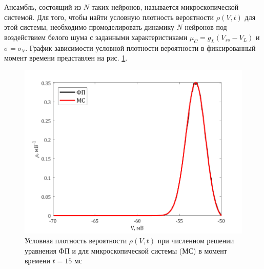 Ансамбль, состоящий из $N$ таких нейронов, называется микроскопической системой. Для того, чтобы найти условную плотность вероятности $\rho(V,t)$ для этой системы, необходимо промоделировать динамику $N$ нейронов под воздействием белого шума с заданными характеристиками $\mu_C=g_L(V_{ss}-V_L)$ и $\sigma=\sigma_V$. 
График зависимости условной плотности вероятности в фиксированный момент времени представлен на рис. \ref{pic:3}.
\begin{figure}[H]
	\centering
	\includegraphics[width=\linewidth]{pic/rhomicro.png}
	\caption{Условная плотность вероятности $\rho(V,t)$ при численном решении уравнения ФП и для микроскопической системы (МС) в момент времени $t=15\text{ мс}$}
	\label{pic:3}
\end{figure}

